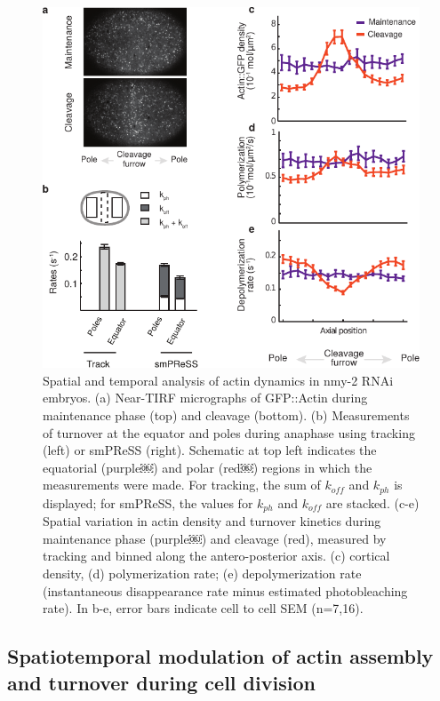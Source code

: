  \begin{figure}[h!]
 	\centering
 	\includegraphics[width=0.8\hsize]{nmeth/Fig4}
 	\caption[Spatial and temporal analysis of actin dynamics in nmy-2 RNAi embryos.]{\label{fig:fig4} Spatial and temporal analysis of actin dynamics in nmy-2 RNAi embryos. (a) Near-TIRF micrographs of GFP::Actin during maintenance phase (top) and cleavage (bottom). (b) Measurements of turnover at the equator and poles during anaphase using tracking (left) or smPReSS (right). Schematic at top left indicates the equatorial (purple￼) and polar (red￼) regions in which the measurements were made. For tracking, the sum of $k_{off}$ and $k_{ph}$ is displayed; for smPReSS, the values for $k_{ph}$ and $k_{off}$ are stacked. (c-e) Spatial variation in actin density and turnover kinetics during maintenance phase (purple￼) and cleavage (red), measured by tracking and binned along the antero-posterior axis. (c) cortical density, (d) polymerization rate; (e) depolymerization rate (instantaneous disappearance rate minus estimated photobleaching rate). In b-e, error bars indicate cell to cell SEM (n=7,16). }
 \end{figure}
 
 
 
 \subsection{Spatiotemporal modulation of actin assembly and turnover during cell division}
 
